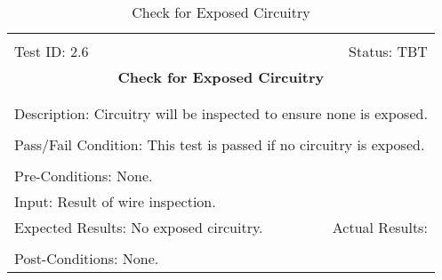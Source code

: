 \documentclass[titlepage]{article}
\begin{document}
\begin{center}%
\begin{table}
\begin{tabular}{|l r|}\hline&\\[-2mm]
	Test ID: 2.6	&Status: TBT\\[-3mm]
	\multicolumn{2}{|c|}{\textbf{\large{Check for Exposed Circuitry}}}\\&\\\hline&\\[-3mm]
	\multicolumn{2}{|p{\textwidth}|}{Description: Circuitry will be inspected to ensure none is exposed.}\\[1mm]\hline&\\[-3mm]
	\multicolumn{2}{|p{\textwidth}|}{Pass/Fail Condition: This test is passed if no circuitry is exposed.}\\[1mm]\hline&\\[-3mm]
	\multicolumn{2}{|p{\textwidth}|}{Pre-Conditions: None.}\\[4mm]
	\multicolumn{2}{|p{\textwidth}|}{Input: Result of wire inspection.}\\[2mm]\hline
	\multicolumn{1}{|p{0.49\textwidth}}{Expected Results: No exposed circuitry.}	&\multicolumn{1}{|p{0.45\textwidth}|}{Actual Results:}\\\hline&\\[-3mm]
	\multicolumn{2}{|p{\textwidth}|}{Post-Conditions: None.}\\\hline
\end{tabular}
\caption{Check for Exposed Circuitry}
\end{table}
\end{center}
\end{document}
